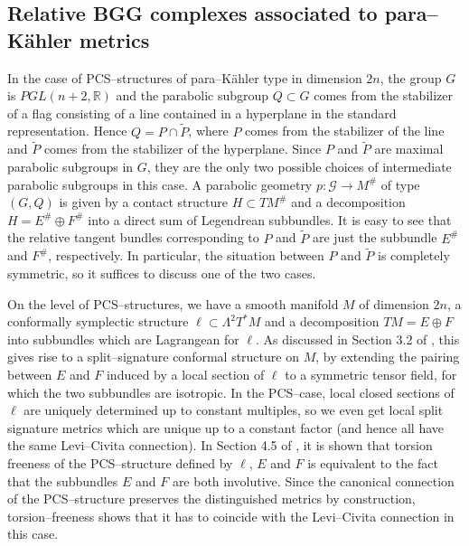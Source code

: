 \documentclass[12pt,a4paper]{amsart}
\def\Bbb{\mathbb}
\def\Cal{\mathcal}
\newcommand{\La}{\Lambda}
\numberwithin{theorem}{section}
\theoremstyle{definition}
\theoremstyle{remark}
\begin{document}
\subsection{Relative BGG complexes associated to para--K\"ahler
  metrics}\label{3.6} 

In the case of PCS--structures of para--K\"ahler type in dimension
$2n$, the group $G$ is $PGL(n+2,\Bbb R)$ and the parabolic subgroup
$Q\subset G$ comes from the stabilizer of a flag consisting of a line
contained in a hyperplane in the standard representation. Hence
$Q=P\cap \tilde P$, where $P$ comes from the stabilizer of the line
and $\tilde P$ comes from the stabilizer of the hyperplane. Since $P$
and $\tilde P$ are maximal parabolic subgroups in $G$, they are the
only two possible choices of intermediate parabolic subgroups in this
case. A parabolic geometry $p:\Cal G\to M^\#$ of type $(G,Q)$ is given
by a contact structure $H\subset TM^\#$ and a decomposition
$H=E^\#\oplus F^\#$ into a direct sum of Legendrean subbundles. It is
easy to see that the relative tangent bundles corresponding to $P$ and
$\tilde P$ are just the subbundle $E^\#$ and $F^\#$, respectively. In
particular, the situation between $P$ and $\tilde P$ is completely
symmetric, so it suffices to discuss one of the two cases.

On the level of PCS--structures, we have a smooth manifold $M$ of
dimension $2n$, a conformally symplectic structure
$\ell\subset\La^2T^*M$ and a decomposition $TM=E\oplus F$ into
subbundles which are Lagrangean for $\ell$. As discussed in Section
3.2 of \cite{PCS1}, this gives rise to a split--signature conformal
structure on $M$, by extending the pairing between $E$ and $F$ induced
by a local section of $\ell$ to a symmetric tensor field, for which
the two subbundles are isotropic. In the PCS--case, local closed
sections of $\ell$ are uniquely determined up to constant multiples,
so we even get local split signature metrics which are unique up to a
constant factor (and hence all have the same Levi--Civita connection).
In Section 4.5 of \cite{PCS1}, it is shown that torsion freeness of
the PCS--structure defined by $\ell$, $E$ and $F$ is equivalent to the
fact that the subbundles $E$ and $F$ are both involutive. Since the
canonical connection of the PCS--structure preserves the distinguished
metrics by construction, torsion--freeness shows that it has to
coincide with the Levi--Civita connection in this case.
\end{document}
